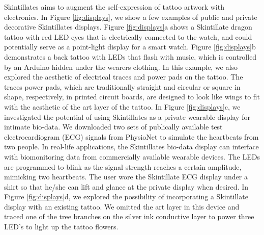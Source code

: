 \documentclass{sigchi}
\begin{document}
Skintillates aims to augment the self-expression of tattoo artwork with electronics. In Figure \ref{fig:displays}, we show a few examples of public and private decorative Skintillates displays. Figure \ref{fig:displays}a shows a Skintillate dragon tattoo with red LED eyes that is electrically connected to the watch, and could potentially serve as a point-light display for a smart watch. Figure \ref{fig:displays}b demonstrates a back tattoo with LEDs that flash with music, which is controlled by an Arduino hidden under the wearers clothing. In this example, we also explored the aesthetic of electrical traces and power pads on the tattoo. The traces power pads, which are traditionally straight and circular or square in shape, respectively, in printed circuit boards, are designed to look like wings to fit with the aesthetic of the art layer of the tattoo. In Figure \ref{fig:displays}c, we investigated the potential of using Skintillates as a private wearable display for intimate bio-data. We downloaded two sets of publically available test electrocardiogram (ECG) signals from PhysioNet to simulate the heartbeats from two people. In real-life applications, the Skintillates bio-data display can interface with biomonitoring data from commercially available wearable devices. The LEDs are programmed to blink as the signal strength reaches a certain amplitude, mimicking two heartbeats. The user wore the Skintillate ECG display under a shirt so that he/she can lift and glance at the private display when desired. In Figure \ref{fig:displays}d, we explored the possibility of incorporating a Skintillate display with an existing tattoo. We omitted the art layer in this device and traced one of the tree branches on the silver ink conductive layer to power three LED’s to light up the tattoo flowers.
\end{document}
